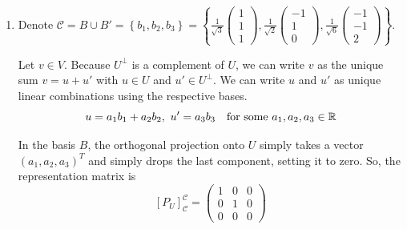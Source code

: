 \documentclass[12pt]{article}
\begin{document}
\begin{enumerate}[label=\alph*)]
    We then obtain the set
    $$
        \left\{ \frac{1}{\sqrt{3}}\begin{pmatrix} 1 \\ 1 \\ 1 \end{pmatrix}, \frac{1}{\sqrt{2}}\begin{pmatrix} -1 \\ 1 \\ 0 \end{pmatrix}, \frac{1}{\sqrt{6}}\begin{pmatrix} -1 \\ -1 \\ 2 \end{pmatrix} \right\}
    $$

    So we have the following basis $B'$ for $U^\perp$:
    $$
        B' = \left\{ \frac{1}{\sqrt{6}}\begin{pmatrix} -1 \\ -1 \\ 2 \end{pmatrix} \right\}
    $$

    Because this basis only contains one element, which is normalised, it is an orthonormal basis for $U^\perp$.

    \item Denote $\mathcal{C} = B \cup B' = \left\{b_1, b_2, b_3\right\} = \left\{ \frac{1}{\sqrt{3}}\begin{pmatrix} 1 \\ 1 \\ 1 \end{pmatrix}, \frac{1}{\sqrt{2}}\begin{pmatrix} -1 \\ 1 \\ 0 \end{pmatrix}, \frac{1}{\sqrt{6}}\begin{pmatrix} -1 \\ -1 \\ 2 \end{pmatrix} \right\}$.
    
    Let $v \in V$. Because $U^\perp$ is a complement of $U$, we can write $v$ as the unique sum $v = u + u'$ with $u \in U$ and $u' \in U^\perp$. We can write $u$ and $u'$ as unique linear combinations using the respective bases.
    $$
        u = a_1b_1 + a_2b_2,\ u' = a_3b_3 \quad \text{for some } a_1,a_2,a_3 \in \mathbb{R}
    $$

    In the basis $B$, the orthogonal projection onto $U$ simply takes a vector $(a_1, a_2, a_3)^T$ and simply drops the last component, setting it to zero. So, the representation matrix is
    $$
        \boxed{[P_U]_{\mathcal{C}}^{\mathcal{C}} = 
        \begin{pmatrix}
            1 & 0 & 0 \\
            0 & 1 & 0 \\
            0 & 0 & 0
        \end{pmatrix}}
    $$


\end{enumerate}
\end{document}
